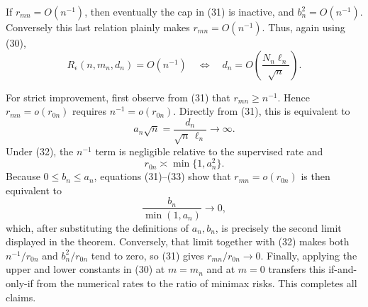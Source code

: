 If \(r_{mn}=O(n^{-1})\), then eventually the cap in (31) is inactive,
and \(b_n^2=O(n^{-1})\).  Conversely this last relation plainly makes
\(r_{mn}=O(n^{-1})\).  Thus, again using (30),
\[
 R_\epsilon(n,m_n,d_n)=O(n^{-1})
 \quad\Longleftrightarrow\quad
 d_n=O\!\left(\frac{N_n\ell_n}{\sqrt n}\right).
\]

For strict improvement, first observe from (31) that
\(r_{mn}\ge n^{-1}\).  Hence \(r_{mn}=o(r_{0n})\) requires
\(n^{-1}=o(r_{0n})\).  Directly from (31), this is equivalent to
\[
 a_n\sqrt n=\frac{d_n}{\sqrt n\,\ell_n}\longrightarrow\infty.    \tag{32}
\]
Under (32), the \(n^{-1}\) term is negligible relative to the
supervised rate and
\[
 r_{0n}\asymp\min\{1,a_n^2\}.                    \tag{33}
\]
Because \(0\le b_n\le a_n\), equations (31)--(33) show that
\(r_{mn}=o(r_{0n})\) is then equivalent to
\[
 \frac{b_n}{\min(1,a_n)}\longrightarrow0,
\]
which, after substituting the definitions of \(a_n,b_n\), is precisely
the second limit displayed in the theorem.  Conversely, that limit
together with (32) makes both \(n^{-1}/r_{0n}\) and
\(b_n^2/r_{0n}\) tend to zero, so (31) gives
\(r_{mn}/r_{0n}\to0\).  Finally, applying the upper and lower constants
in (30) at \(m=m_n\) and at \(m=0\) transfers this if-and-only-if from
the numerical rates to the ratio of minimax risks.  This completes all
claims.
